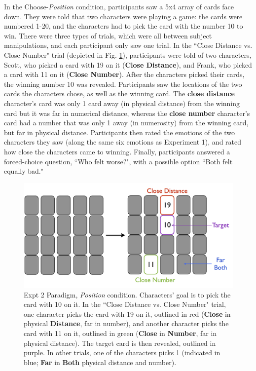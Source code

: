 \documentclass[10pt,letterpaper]{article}
\begin{document}
	In the Choose-\textit{Position} condition, participants saw a 5x4 array of cards face down. They were told that two characters were playing a game: the cards were numbered 1-20, and the characters had to pick the card with the number 10 to win. There were three types of trials, which were all between subject manipulations, and each participant only saw one trial. In the ``Close Distance vs. Close Number" trial (depicted in Fig. \ref{Expt2ParadigmFig}), participants were told of two characters, Scott, who picked a card with 19 on it (\textbf{Close Distance}), and Frank, who picked a card with 11 on it (\textbf{Close Number}). After the characters picked their cards, the winning number 10 was revealed. Participants saw the locations of the two cards the characters chose, as well as the winning card. The \textbf{close distance} character's card was only 1 card away (in physical distance) from the winning card but it was far in numerical distance, whereas the \textbf{close number} character's card had a number that was only 1 away (in numerosity) from the winning card, but far in physical distance. Participants then rated the emotions of the two characters they saw (along the same six emotions as Experiment 1), and rated how close the characters came to winning. Finally, participants answered a forced-choice question, ``Who felt worse?", with a possible option ``Both felt equally bad."

\begin{figure}[htb!]
\includegraphics[width=\columnwidth]{images/card_paradigm.png}
\caption{ Expt 2 Paradigm, \textit{Position} condition. Characters' goal is to pick the card with 10 on it. In the ``Close Distance vs. Close Number" trial, one character picks the card with 19 on it, outlined in red (\textbf{Close} in physical \textbf{Distance}, far in number), and another character picks the card with 11 on it, outlined in green (\textbf{Close} in \textbf{Number}, far in physical distance). The target card is then revealed, outlined in purple. In other trials, one of the characters picks 1 (indicated in blue; \textbf{Far} in \textbf{Both} physical distance and number). }
\label{Expt2ParadigmFig}
\end{figure}
\end{document}

